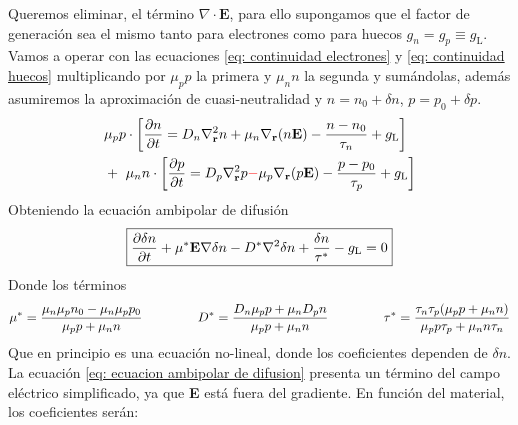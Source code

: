 \noindent Queremos eliminar, el término $\nabla \cdot \mathbf{E}$, para ello supongamos que el factor de generación sea el mismo tanto para electrones como para huecos $g_n=g_p\equiv g_\mathrm{L}$. Vamos a operar con las ecuaciones \ref{eq: continuidad electrones} y \ref{eq: continuidad huecos} multiplicando por $\mu_p p$ la primera y $\mu_n n$ la segunda y sumándolas, además asumiremos la aproximación de cuasi-neutralidad y $n=n_0+\delta n$, $p=p_0+\delta p$.
\begin{equation*}
\begin{aligned}
&\mu_p p \cdot \left [\pdiff[]{n}{t}=D_n \nabla_\mathbf{r}^2 n+ \mu_n \nabla_\mathbf{r} (n\mathbf{E})-\frac{n-n_0}{\tau_n}+g_\mathrm{L} \right ] \\
    &+ \ \mu_n n \cdot \left [ \pdiff[]{p}{t}=D_p \nabla_\mathbf{r}^2 p  \textcolor{red}{- } \mu_p \nabla_\mathbf{r} (p\mathbf{E})-\frac{p-p_0}{\tau_p}+g_\mathrm{L} \right ] \end{aligned}
\end{equation*}
Obteniendo la ecuación ambipolar de difusión
\begin{equation}
    \boxed{\pdiff[]{\delta n}{t}+ \mu ^* \mathbf{E} \nabla \delta n-D^* \nabla^2 \delta n +\frac{\delta n}{\tau^*}-g_\mathrm{L}=0}
    \label{eq: ecuacion ambipolar de difusion}
\end{equation}
Donde los términos $$\mu^*=\frac{\mu_n \mu_p n_0-\mu_n\mu_p p_0}{\mu_pp+\mu_nn} \hspace{1.5cm} D^*=\frac{D_n\mu_pp+\mu_nD_pn}{\mu_pp+\mu_nn} \hspace{1.5cm} \tau^*=\frac{\tau_n\tau_p(\mu_pp+\mu_nn)}{\mu_pp\tau_p+\mu_nn\tau_n}$$ 
Que en principio es una ecuación no-lineal, donde los coeficientes dependen de $\delta n$.
La ecuación \ref{eq: ecuacion ambipolar de difusion} presenta un término del campo eléctrico simplificado, ya que \textbf{E} está fuera del gradiente. En función del material, los coeficientes serán:
